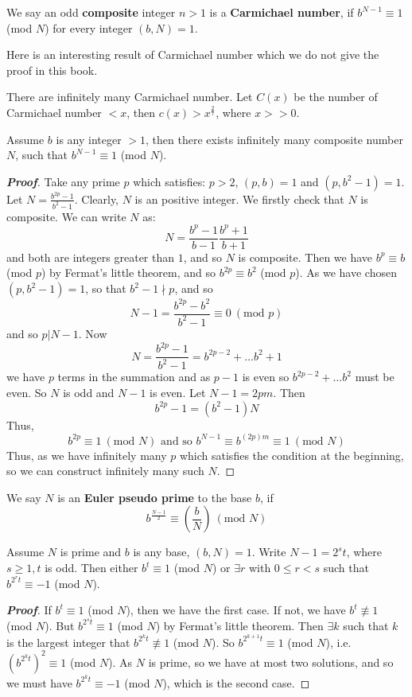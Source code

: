 \begin{definition} We say an odd {\bf composite} integer $n>1$ is a {\bf Carmichael number}\label{C;Carmichael}, if $b^{N-1} \equiv 1$ (mod $N$) for every integer $(b,N)=1$.
\end{definition}
Here is an interesting result of Carmichael number which we do not give the proof in this book.
\begin{theorem} There are infinitely many Carmichael number. Let $C(x)$ be the number of Carmichael number $<x$, then $c(x)> x^{\frac{2}{7}}$, where $x >> 0$.
\end{theorem}
\begin{theorem} Assume $b$ is any integer $>1$, then there exists infinitely many composite number $N$, such that $b^{N-1} \equiv 1$ (mod $N$).
\end{theorem}
\begin{proof}[\bf Proof] Take any prime $p$ which satisfies: $p>2$, $(p,b)=1$ and $(p, b^2-1)=1$.
Let $N=\frac{b^{2p}-1}{b^2-1}$. Clearly, $N$ is an positive integer. We firstly check that $N$ is composite. We can write $N$ as:
$$N=\frac{b^p-1}{b-1} \frac{b^p+1}{b+1}$$ and both are integers greater than $1$, and so $N$ is composite.
Then we have $b^p \equiv b$ (mod $p$) by Fermat's little theorem, and so $b^{2p} \equiv b^2$ (mod $p$).
As we have chosen $(p,b^2-1)=1$, so that $b^2-1 \nmid p$, and so
$$N-1=\frac{b^{2p}-b^2}{b^2-1} \equiv 0~(\text{mod } p)$$
and so $p|N-1$.
Now
$$N=\frac{b^{2p}-1}{b^2-1} = b^{2p-2}+\ldots b^2+1$$
we have $p$ terms in the summation and as $p-1$ is even so $b^{2p-2}+\ldots b^2$ must be even.
So $N$ is odd and $N-1$ is even. Let $N-1=2pm$. Then
$$b^{2p}-1=(b^2-1)N$$
Thus,
$$b^{2p} \equiv 1~(\text{mod } N) \text{ and so } b^{N-1} \equiv b^{(2p)m} \equiv 1~(\text{mod } N)$$
Thus, as we have infinitely many $p$ which satisfies the condition at the beginning, so we can construct infinitely many such $N$.
\end{proof}
\begin{definition} We say $N$ is an {\bf Euler pseudo prime}\label{E;Euler pseudo} to the base $b$, if
$$b^{\frac{N-1}{2}} \equiv \left(\frac{b}{N}\right)~(\text{mod } N)$$
\end{definition}
\begin{lemma} Assume $N$ is prime and $b$ is any base, $(b,N)=1$. Write $N-1=2^s t$, where $s \ge 1, t$ is odd. Then either $b^t \equiv 1$ (mod $N$) or $\exists r$ with $0 \le r <s$ such that $b^{2^r t} \equiv -1 $ (mod $N$).
\end{lemma}
\begin{proof}[\bf Proof] If $b^t \equiv 1$ (mod $N$), then we have the first case.
If not, we have $b^t \not \equiv 1$ (mod $N$). But $b^{2^s t} \equiv 1$ (mod $N$) by Fermat's little theorem. Then $\exists k$ such that $k$ is the largest integer that $b^{2^k t} \not \equiv 1$ (mod $N$).
So $b^{2^{k+1} t} \equiv 1$ (mod $N$), i.e. $(b^{2^k t})^2 \equiv 1$ (mod $N$). As $N$ is prime, so we have at most two solutions, and so we must have $b^{2^k t} \equiv -1$ (mod $N$), which is the second case.
\end{proof}
